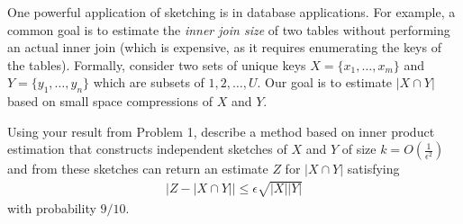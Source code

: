 \documentclass[10pt]{article}
\begin{document}
One powerful application of sketching is in database applications. For example, a common goal is to estimate the \emph{inner join size} of two tables without performing an actual inner join (which is expensive, as it requires enumerating the keys of the tables). Formally, consider two sets of unique keys $X = \{x_1, \ldots, x_m\}$ and $Y = \{y_1, \ldots, y_n\}$ which are subsets of $1,2, \ldots, U$.  Our goal is to estimate $|X\cap Y|$ based on small space compressions of $X$ and $Y$.  

Using your result from Problem 1, describe a method based on inner product estimation that constructs independent sketches of $X$ and $Y$ of size  $k = O\left(\frac{1}{\epsilon^2}\right)$ and from these sketches can return an estimate $Z$ for $|X\cap Y|$ satisfying
\begin{align*}
	\left|Z - |X\cap Y|\right| \leq \epsilon \sqrt{|X||Y|}
\end{align*}
with probability $9/10$.

%
%


\end{document}
